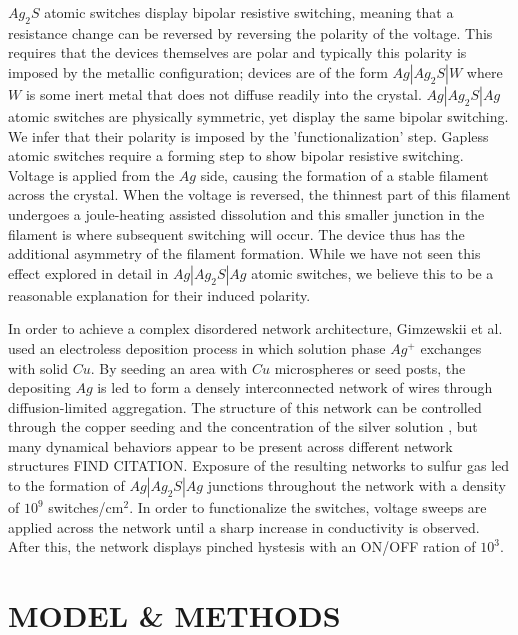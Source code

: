 \documentclass[aps,prl,preprint,groupedaddress]{revtex4-1}
\begin{document}
$Ag_2 S$ atomic switches display bipolar resistive switching, meaning that
a resistance change can be reversed by reversing the polarity of the voltage.
This requires that the devices themselves are polar and typically this
polarity is imposed by the metallic configuration; devices are of the form
$Ag|Ag_2 S|W$ where $W$ is some inert metal that does not diffuse readily into
the crystal.  $Ag|Ag_2 S| Ag$ atomic switches are physically symmetric, yet
display the same bipolar switching.  We infer that their polarity is imposed
by the
'functionalization' step.  Gapless atomic switches require a forming step
to show bipolar resistive switching.  Voltage is applied from the $Ag$ side,
causing the formation of a stable filament across the crystal.  When the
voltage is reversed, the thinnest part of this filament undergoes a 
joule-heating assisted dissolution \cite{Hasegawa2012} and this smaller
junction in the filament is where subsequent switching will occur.  The device
thus has the additional asymmetry of the filament formation.  While we have
not seen this effect explored in detail in $Ag|Ag_2 S |Ag$ atomic switches,
we believe this to be a reasonable explanation for their induced polarity.

In order to achieve a complex disordered network architecture, Gimzewskii et
al. used an electroless deposition process in which solution phase $Ag^+$
exchanges with solid $Cu$.  By seeding an area with $Cu$ 
microspheres or seed posts, the depositing $Ag$ is led to form a
densely interconnected network of wires through diffusion-limited aggregation.
The structure of this network can be controlled through the copper
seeding and the concentration of the silver solution \cite{Avizienis2013},
but many dynamical behaviors appear to be present across different network
structures FIND CITATION.  Exposure of the resulting networks to sulfur gas
led to the formation of $Ag|Ag_2 S|Ag$ junctions throughout the network with
a density of $10^9$ switches/cm$^2$.  In order to functionalize the switches,
voltage sweeps are applied across the network until a sharp increase
in conductivity is observed.  After this, the network displays pinched
hystesis with an ON/OFF ration of $10^3$.

\section{MODEL \& METHODS}
\end{document}
